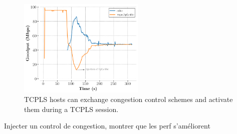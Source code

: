 \begin{figure}[!t]
  \begin{center}
    \includegraphics[width=6cm]{pretty_plotify/plots/vegas_cubic.png}
  \end{center}
  \caption{TCPLS hosts can exchange congestion control schemes and activate them during a TCPLS session.}
  \label{fig:vegasCubic}
\end{figure}











Injecter un control de congestion, montrer que les perf s'améliorent
